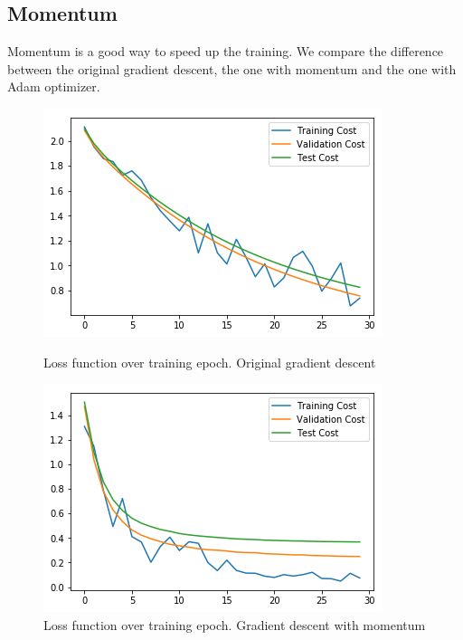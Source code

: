 \documentclass{article}
\begin{document}
\subsection{Momentum}
Momentum is a good way to speed up the training. We compare the difference between the original gradient descent, the one with momentum and the one with Adam optimizer.

\begin{figure}[h]
	\begin{minipage}{0.3\textwidth}
	\centering
	\includegraphics[width=\textwidth]{pics/loss_original.png}
	\caption{Loss function over training epoch. Original gradient descent}
	\end{minipage}\hfill
	\begin{minipage}{0.3\textwidth}
	\centering
	\includegraphics[width=\textwidth]{pics/loss_momentum.png}
	\caption{Loss function over training epoch. Gradient descent with momentum}

\end{minipage}
\end{figure}
\end{document}
